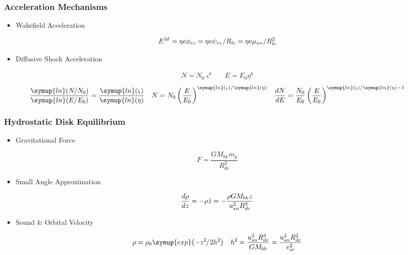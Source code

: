 	\begin{frame}
		\frametitle{Acceleration Mechanisms}
		\begin{itemize}
			\item Wakefield Acceleration
		\end{itemize}
			\begin{equation*}
				E^M = \eta e \phi_{rc} = \eta e \psi_{rc} \kern+0.7pt / R_{lc} = \eta e \mu_{ns} \kern+0.7pt / R_{lc}^2
			\end{equation*}
		\begin{itemize}
			\item Diffusive Shock Acceleration
		\end{itemize}
			\vspace{-1em}
			\begin{align*}
				&&&&&&&&&& N = N_0 \varsigma^k && E = E_0 \eta^k &&&&&&&&&&
			\end{align*}
			\begin{align*}
				&&&& \frac{\symup{ln}(N / N_0)}{\symup{ln}(E / E_0)} = \frac{\symup{ln}(\varsigma)}{\symup{ln}(\eta)} &&
				N = N_0 \left( \frac{E}{E_0} \right)^{\symup{ln} (\varsigma) / \symup{ln} (\eta)} &&
				\frac{dN}{dE} = \frac{N_0}{E_0} \left( \frac{E}{E_0} \right)^{\symup{ln} (\varsigma) / \symup{ln} (\eta) \kern+0.8pt - 1}
				&&&&
			\end{align*}
	\end{frame}

	\begin{frame}
		\frametitle{Hydrostatic Disk Equilibrium}
		\begin{itemize}
			\item Gravitational Force
		\end{itemize}
			\begin{equation*}
				F = \frac{G M_{bh} m_p}{R_{dc}^2}
			\end{equation*}
		\begin{itemize}
			\item Small Angle Approximation
		\end{itemize}
			\begin{equation*}
				\frac{d \rho}{d z} = -\rho \ddot{z} = -\frac{\rho G M_{bh} z}{u_{\vphantom{d}sn}^2 R_{dc}^3}
			\end{equation*}
		\begin{itemize}
			\item Sound \& Orbital Velocity
		\end{itemize}
			\vspace{-1em}
			\begin{align*}
				&&&&&& \rho = \rho_0 \symup{exp} \bigl( - z^2 \kern-1pt / \kern+0.5pt 2h^2 \bigr) &&
				h^2 \kern-0.2pt = \frac{u_{\vphantom{d}sn}^2 R_{dc}^3}{GM_{bh}} = \frac{u_{\vphantom{d}sn}^2 R_{dc}^2}{v_{or}^2} &&&&&&
			\end{align*}
	\end{frame}

